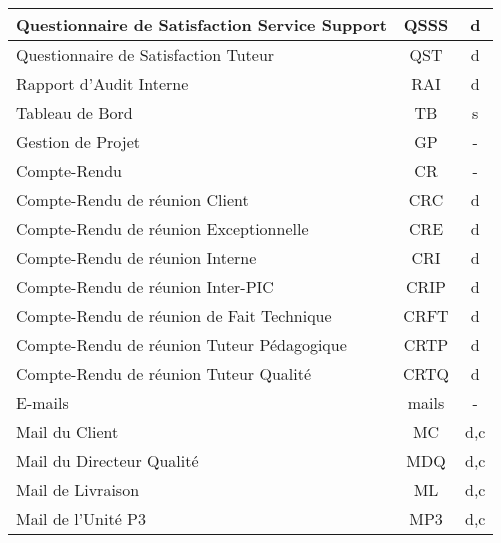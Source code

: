 \begin{longtable}{|p{12cm}|c|c|}
    \hline
    \hspace{2cm} Questionnaire de Satisfaction Service Support & QSSS & d\\
    \hline
    \hspace{2cm} Questionnaire de Satisfaction Tuteur & QST & d\\    
    \hline
    \hspace{1cm} Rapport d'Audit Interne & RAI & d\\
    \hline
    \hspace{1cm} Tableau de Bord & TB & s\\
    \hline
    Gestion de Projet & GP & -\\
    \hline
    \hspace{1cm} Compte-Rendu & CR & -\\
    \hline
    \hspace{2cm} Compte-Rendu de réunion Client & CRC & d\\
    \hline
    \hspace{2cm} Compte-Rendu de réunion Exceptionnelle & CRE & d\\
    \hline
    \hspace{2cm} Compte-Rendu de réunion Interne & CRI & d\\
    \hline
    \hspace{2cm} Compte-Rendu de réunion Inter-PIC & CRIP & d\\
    \hline
    \hspace{2cm} Compte-Rendu de réunion de Fait Technique & CRFT & d\\
    \hline
    \hspace{2cm} Compte-Rendu de réunion Tuteur Pédagogique & CRTP & d\\
    \hline
    \hspace{2cm} Compte-Rendu de réunion Tuteur Qualité & CRTQ & d\\
    \hline
    \hspace{1cm} E-mails & mails & -\\
    \hline
    \hspace{2cm} Mail du Client & MC & d,c\\
    \hline
    \hspace{2cm} Mail du Directeur Qualité & MDQ & d,c\\
    \hline
    \hspace{2cm} Mail de Livraison & ML & d,c\\
    \hline
    \hspace{2cm} Mail de l'Unité P3 & MP3 & d,c\\

\end{longtable}

